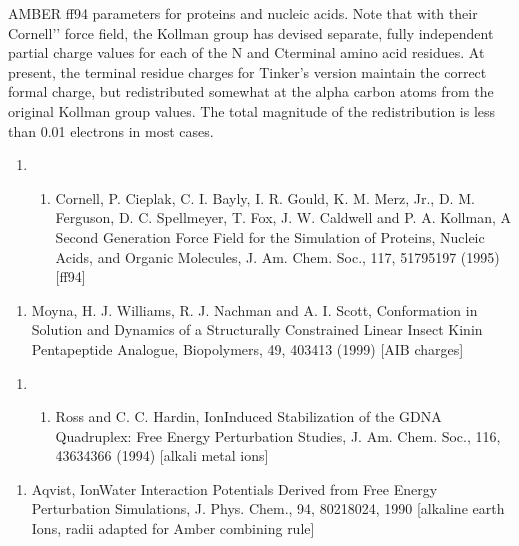 \documentclass[letterpaper,11pt,english]{sphinxmanual}
\begin{document}

AMBER ff94 parameters for proteins and nucleic acids. Note that with their {\color{red}\bfseries{}\textasciigrave{}\textasciigrave{}}Cornell’’ force field, the Kollman group has devised separate, fully independent partial charge values for each of the N\sphinxhyphen{} and C\sphinxhyphen{}terminal amino acid residues. At present, the terminal residue charges for Tinker’s version maintain the correct formal charge, but redistributed somewhat at the alpha carbon atoms from the original Kollman group values. The total magnitude of the redistribution is less than 0.01 electrons in most cases.
\begin{enumerate}
%
\setcounter{enumi}{22}
\item {} \begin{enumerate}
%
\setcounter{enumii}{3}
\item {} 
Cornell, P. Cieplak, C. I. Bayly, I. R. Gould, K. M. Merz, Jr., D. M. Ferguson, D. C. Spellmeyer, T. Fox, J. W. Caldwell and P. A. Kollman, A Second Generation Force Field for the Simulation of Proteins, Nucleic Acids, and Organic Molecules, J. Am. Chem. Soc., 117, 5179\sphinxhyphen{}5197 (1995)  {[}ff94{]}

\end{enumerate}

\end{enumerate}
\begin{enumerate}
%
\setcounter{enumi}{6}
\item {} 
Moyna, H. J. Williams, R. J. Nachman and A. I. Scott, Conformation in Solution and Dynamics of a Structurally Constrained Linear Insect Kinin Pentapeptide Analogue, Biopolymers, 49, 403\sphinxhyphen{}413 (1999)  {[}AIB charges{]}

\end{enumerate}
\begin{enumerate}
%
\setcounter{enumi}{22}
\item {} \begin{enumerate}
%
\setcounter{enumii}{18}
\item {} 
Ross and C. C. Hardin, Ion\sphinxhyphen{}Induced Stabilization of the G\sphinxhyphen{}DNA Quadruplex: Free Energy Perturbation Studies, J. Am. Chem. Soc., 116, 4363\sphinxhyphen{}4366 (1994)   {[}alkali metal ions{]}

\end{enumerate}

\end{enumerate}
\begin{enumerate}
%
\setcounter{enumi}{9}
\item {} 
Aqvist, Ion\sphinxhyphen{}Water Interaction Potentials Derived from Free Energy Perturbation Simulations, J. Phys. Chem., 94, 8021\sphinxhyphen{}8024, 1990  {[}alkaline earth Ions, radii adapted for Amber combining rule{]}

\end{enumerate}
\end{document}
